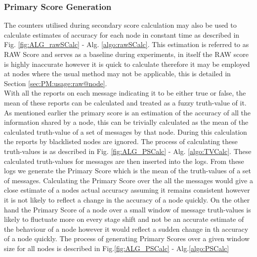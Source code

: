 \documentclass[journal]{IEEEtran}
\begin{document}
\subsubsection{Primary Score Generation}
The counters utilised during secondary score calculation may also be used to calculate estimates of accuracy for each node in constant time as described in Fig. \ref{fig:ALG_rawSCalc} - Alg. \ref{algo:rawSCalc}. This estimation is referred to as RAW Score and serves as a baseline during experiments, in itself the RAW score is highly inaccurate however it is quick to calculate therefore it may be employed at nodes where the usual method may not be applicable, this is detailed in Section \ref{sec:PM:usage:raw@node}.\\
With all the reports on each message indicating it to be either true or false, the mean of these reports can be calculated and treated as a fuzzy truth-value of it. As mentioned earlier the primary score is an estimation of the accuracy of all the information shared by a node, this can be trivially calculated as the mean of the calculated truth-value of a set of messages by that node. During this calculation the reports by blacklisted nodes are ignored. The process of calculating these truth-values is as described in Fig. \ref{fig:ALG_PSCalc} - Alg. \ref{algo:TVCalc}. These calculated truth-values for messages are then inserted into the logs. From these logs we generate the Primary Score which is the mean of the truth-values of a set of messages. Calculating the Primary Score over the all the messages would give a close estimate of a nodes actual accuracy assuming it remains consistent however it is not likely to reflect a change in the accuracy of a node quickly. On the other hand the Primary Score of a node over a small window of message truth-values is likely to fluctuate more on every stage shift and not be an accurate estimate of the behaviour of a node however it would reflect a sudden change in th accuracy of a node quickly. The process of generating Primary Scores over a given window size for all nodes is described in Fig.\ref{fig:ALG_PSCalc} - Alg.\ref{algo:PSCalc}
\end{document}
